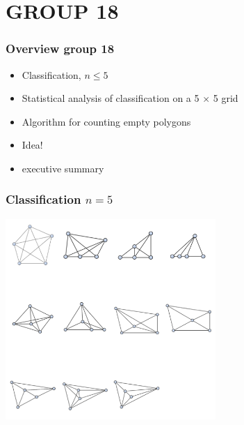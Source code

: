 
\section{GROUP 18}
\begin{frame}
\frametitle{Overview group 18}
\begin{itemize}
\item Classification, $n\leq 5$
\item Statistical analysis of classification on a 5 $\times$ 5 grid
\item Algorithm for counting empty polygons
\item Idea!
\item executive summary
\end{itemize}
\end{frame}


\begin{frame}
\frametitle{Classification $n=5$}
\begin{center}
\includegraphics[width=8cm]{classification_overview.png}
\end{center}
\end{frame}


